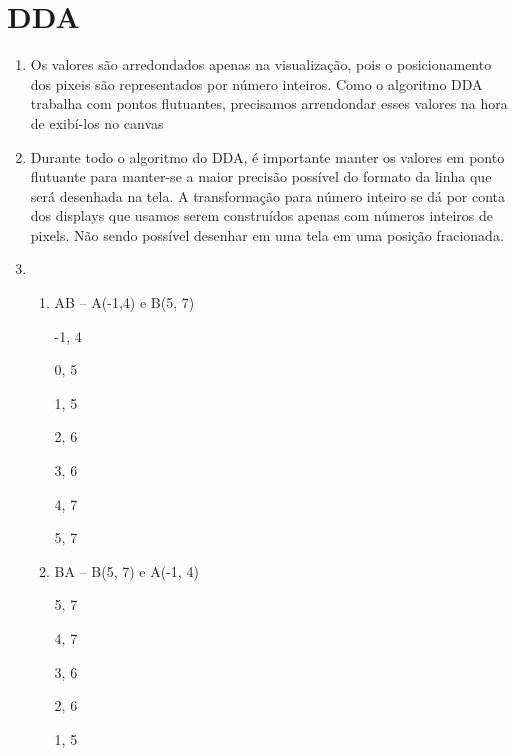 \section*{DDA}

	\begin{enumerate}\addtocounter{enumi}{7}
		\item 
		Os valores são arredondados apenas na visualização, pois o posicionamento
		dos pixeis são representados por número inteiros. Como o algoritmo DDA trabalha
		com pontos flutuantes, precisamos arrendondar esses valores na hora de exibí-los no
		canvas
		\item 
       Durante todo o algoritmo do DDA, é importante manter os valores em ponto flutuante
       para manter-se a maior precisão possível do formato da linha que será desenhada na tela. A
       transformação para número inteiro se dá por conta dos  displays  que usamos serem  construídos apenas com números inteiros de pixels. Não sendo possível desenhar em uma tela em uma posição fracionada.
		\item 
		
		\begin{enumerate}[label=\alph*.]
				   \setlength\itemsep{1em}
					\item	 AB – A(-1,4) e B(5, 7)
					   				
                         -1, 4
                         
                          0, 5
                          
                           1, 5
                           
                           2, 6
                           
                           3, 6
                           
                           4, 7
                           
                            5, 7
					
					\item    BA – B(5, 7) e A(-1, 4)
					
                           5, 7
                           
                          4, 7
                          
                          3, 6
                          
                          2, 6
                          
                          1, 5
                          

\end{enumerate}
\end{enumerate}
